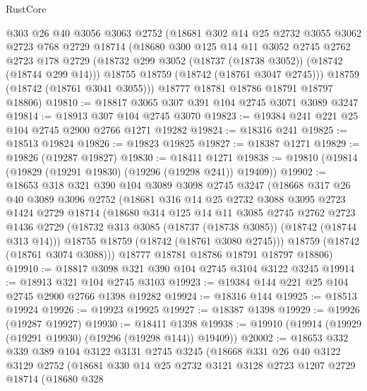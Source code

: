 \begin{lexlean}{RustCore}
\begin{coremodule}
      @303
      @26
      @40
      @3056
      @3063
      @2752
      (@18681
        @302
        @14
        @25
        @2732
        @3055
        @3062
        @2723
        @768
        @2729
        @18714
        (@18680
          @300
          @125
          @14
          @11
          @3052
          @2745
          @2762
          @2723
          @178
          @2729
          (@18732 @299 @3052 (@18737 (@18738 @3052)) (@18742 (@18744 @299 @14)))
          @18755
          @18759
          (@18742 (@18761 @3047 @2745)))
        @18759
        (@18742 (@18761 @3041 @3055)))
      @18777
      @18781
      @18786
      @18791
      @18797
      @18806)
@19810 := @18817 @3065 @307 @391 @104 @2745 @3071 @3089 @3247
@19814 := @18913 @307 @104 @2745 @3070
@19823 := @19384 @241 @221 @25 @104 @2745 @2900 @2766 @1271 @19282
@19824 := @18316 @241
@19825 := @18513 @19824
@19826 := @19823 @19825
@19827 := @18387 @1271
@19829 := @19826 (@19287 @19827)
@19830 := @18411 @1271
@19838 := @19810 (@19814 (@19829 (@19291 @19830) (@19296 (@19298 @241)) @19409))
@19902 := @18653
    @318
    @321
    @390
    @104
    @3089
    @3098
    @2745
    @3247
    (@18668
      @317
      @26
      @40
      @3089
      @3096
      @2752
      (@18681
        @316
        @14
        @25
        @2732
        @3088
        @3095
        @2723
        @1424
        @2729
        @18714
        (@18680
          @314
          @125
          @14
          @11
          @3085
          @2745
          @2762
          @2723
          @1436
          @2729
          (@18732 @313 @3085 (@18737 (@18738 @3085)) (@18742 (@18744 @313 @14)))
          @18755
          @18759
          (@18742 (@18761 @3080 @2745)))
        @18759
        (@18742 (@18761 @3074 @3088)))
      @18777
      @18781
      @18786
      @18791
      @18797
      @18806)
@19910 := @18817 @3098 @321 @390 @104 @2745 @3104 @3122 @3245
@19914 := @18913 @321 @104 @2745 @3103
@19923 := @19384 @144 @221 @25 @104 @2745 @2900 @2766 @1398 @19282
@19924 := @18316 @144
@19925 := @18513 @19924
@19926 := @19923 @19925
@19927 := @18387 @1398
@19929 := @19926 (@19287 @19927)
@19930 := @18411 @1398
@19938 := @19910 (@19914 (@19929 (@19291 @19930) (@19296 (@19298 @144)) @19409))
@20002 := @18653
    @332
    @339
    @389
    @104
    @3122
    @3131
    @2745
    @3245
    (@18668
      @331
      @26
      @40
      @3122
      @3129
      @2752
      (@18681
        @330
        @14
        @25
        @2732
        @3121
        @3128
        @2723
        @1207
        @2729
        @18714
        (@18680
          @328

\end{coremodule}
\end{lexlean}
